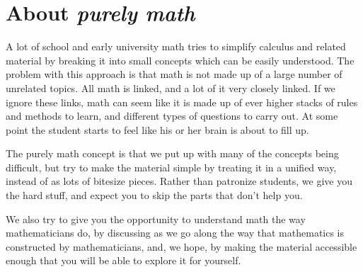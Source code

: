 \chapter{About \emph{purely math}}
A lot of school and early university math tries to simplify calculus and related material by breaking it into small concepts which can be easily understood. The problem with this approach is that math is not made up of a large number of unrelated topics. All math is linked, and a lot of it very closely linked. If we ignore these links, math can seem like it is made up of ever higher stacks of rules and methods to learn, and different types of questions to carry out. At some point the student starts to feel like his or her brain is about to fill up.

The purely math concept is that we put up with many of the concepts being difficult, but try to make the material simple by treating it in a unified way, instead of as lots of bitesize pieces. Rather than patronize students, we give you the hard stuff, and expect you to skip the parts that don't help you.

We also try to give you the opportunity to understand math the way mathematicians do, by discussing as we go along the way that mathematics is constructed by mathematicians, and, we hope, by making the material accessible enough that you will be able to explore it for yourself.